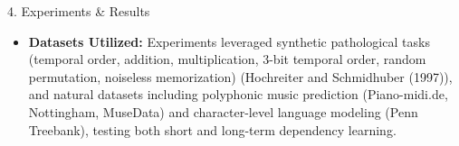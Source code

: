 \documentclass[final]{beamer}
\renewcommand{\normalsize}{\fontsize{18}{22}\selectfont}
\begin{document}
\begin{frame}[t]
\begin{columns}[t,totalwidth=\textwidth]
\begin{column}{0.35\textwidth}
\begin{block}{4. Experiments \& Results}

 \begin{itemize} 

    \item \textbf{Datasets Utilized:} Experiments leveraged synthetic pathological tasks (temporal order, addition, multiplication, 3-bit temporal order, random permutation, noiseless memorization) (Hochreiter and Schmidhuber (1997)), and natural datasets including polyphonic music prediction (Piano-midi.de, Nottingham, MuseData) and character-level language modeling (Penn Treebank), testing both short and long-term dependency learning. 


\end{itemize}
\end{block}
\end{column}
\end{columns}
\end{frame}
\end{document}

